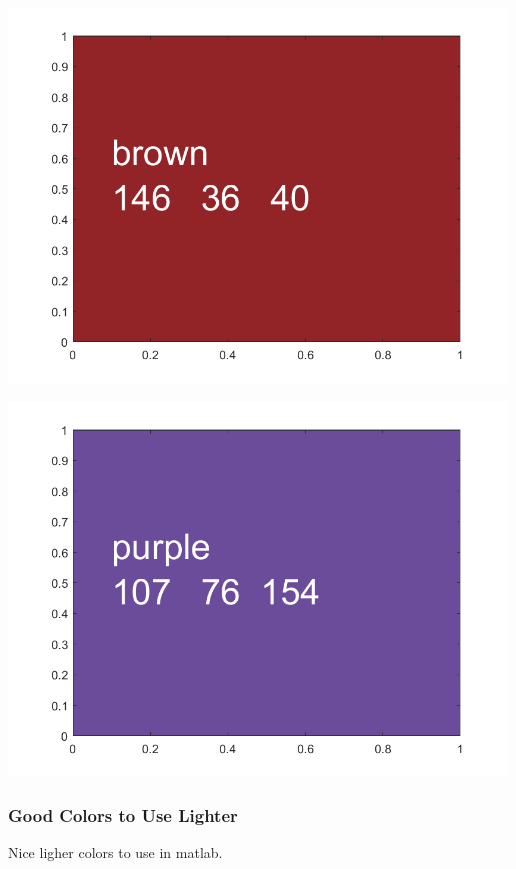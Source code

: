 \documentclass[
]{book}
\begin{document}
\includegraphics[width=5.20833in,height=\textheight]{img/fs_color_images/figure_4.png}

\includegraphics[width=5.20833in,height=\textheight]{img/fs_color_images/figure_5.png}

\hypertarget{good-colors-to-use-lighter}{%
\subsubsection{Good Colors to Use Lighter}\label{good-colors-to-use-lighter}}

Nice ligher colors to use in matlab.
\end{document}

